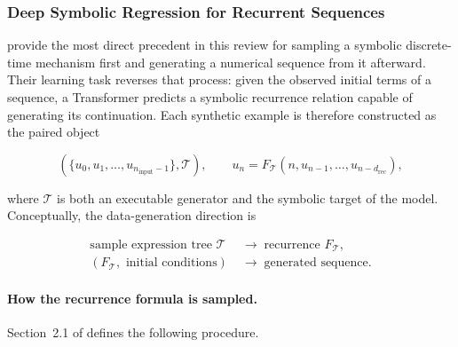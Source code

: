 \subsubsection{Deep Symbolic Regression for Recurrent Sequences}

\citet{dascoli2022deep} provide the most direct precedent in this review for
sampling a symbolic discrete-time mechanism first and generating a numerical
sequence from it afterward. Their learning task reverses that process: given
the observed initial terms of a sequence, a Transformer predicts a symbolic
recurrence relation capable of generating its continuation. Each synthetic
example is therefore constructed as the paired object

\begin{equation}
    \left(
        \{u_0,u_1,\ldots,u_{n_{\mathrm{input}}-1}\},
        \mathcal{T}
    \right),
    \qquad
    u_n
    =F_{\mathcal{T}}
      \left(n,u_{n-1},\ldots,u_{n-d_{\mathrm{rec}}}\right),
\end{equation}

where $\mathcal{T}$ is both an executable generator and the symbolic target of
the model. Conceptually, the data-generation direction is

\begin{equation}
    \boxed{
    \begin{aligned}
    \text{sample expression tree }\mathcal{T}
    &\;\longrightarrow\; \text{recurrence }F_{\mathcal{T}},\\
    \left(F_{\mathcal{T}},\text{ initial conditions}\right)
    &\;\longrightarrow\; \text{generated sequence}.
    \end{aligned}
    }
\end{equation}

\paragraph{How the recurrence formula is sampled.}
Section~2.1 of \citet{dascoli2022deep} defines the following procedure.


